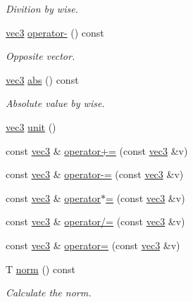 \begin{DoxyCompactItemize}
\begin{DoxyCompactList}\small\item\em Divition by wise. \end{DoxyCompactList}\item 
\mbox{\hyperlink{struct_space_h_1_1vec3}{vec3}} \mbox{\hyperlink{struct_space_h_1_1vec3_a74db760e195c089b32b5319e9d45028e}{operator-\/}} () const
\begin{DoxyCompactList}\small\item\em Opposite vector. \end{DoxyCompactList}\item 
\mbox{\hyperlink{struct_space_h_1_1vec3}{vec3}} \mbox{\hyperlink{struct_space_h_1_1vec3_af82905f49546b9aa03799dcd87bdff0c}{abs}} () const
\begin{DoxyCompactList}\small\item\em Absolute value by wise. \end{DoxyCompactList}\item 
\mbox{\hyperlink{struct_space_h_1_1vec3}{vec3}} \mbox{\hyperlink{struct_space_h_1_1vec3_a7733c9e0651122a67a0fdda34415985c}{unit}} ()
\item 
const \mbox{\hyperlink{struct_space_h_1_1vec3}{vec3}} \& \mbox{\hyperlink{struct_space_h_1_1vec3_a5a9143627e21c4b343b4ac44a5759cc8}{operator+=}} (const \mbox{\hyperlink{struct_space_h_1_1vec3}{vec3}} \&v)
\item 
const \mbox{\hyperlink{struct_space_h_1_1vec3}{vec3}} \& \mbox{\hyperlink{struct_space_h_1_1vec3_a54124bffc816d8dcf912422647bac6c3}{operator-\/=}} (const \mbox{\hyperlink{struct_space_h_1_1vec3}{vec3}} \&v)
\item 
const \mbox{\hyperlink{struct_space_h_1_1vec3}{vec3}} \& \mbox{\hyperlink{struct_space_h_1_1vec3_a845fc96e3ad6efd38ee83c816ebaac98}{operator$\ast$=}} (const \mbox{\hyperlink{struct_space_h_1_1vec3}{vec3}} \&v)
\item 
const \mbox{\hyperlink{struct_space_h_1_1vec3}{vec3}} \& \mbox{\hyperlink{struct_space_h_1_1vec3_a0de32a9762524bf50e592c5a463c29e2}{operator/=}} (const \mbox{\hyperlink{struct_space_h_1_1vec3}{vec3}} \&v)
\item 
const \mbox{\hyperlink{struct_space_h_1_1vec3}{vec3}} \& \mbox{\hyperlink{struct_space_h_1_1vec3_a958945cd614424f1c11daf9397370f6a}{operator=}} (const \mbox{\hyperlink{struct_space_h_1_1vec3}{vec3}} \&v)
\item 
T \mbox{\hyperlink{struct_space_h_1_1vec3_aeec869b0802a468ffff325efb2d0e780}{norm}} () const
\begin{DoxyCompactList}\small\item\em Calculate the norm. \end{DoxyCompactList}\item 

\end{DoxyCompactItemize}
